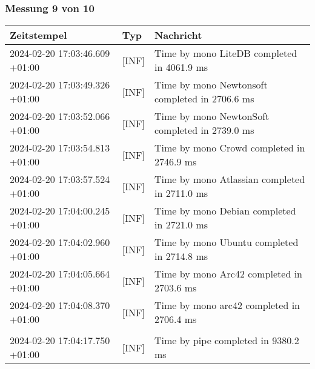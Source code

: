    \subsubsection*{Messung 9 von 10} \label{subsubsec:LiteDbWenigerPaketeAlsDb9von10}
        {
            {\small
                \begin{tabularx}{\textwidth}{|l|l|X|}
                    \hline
                    \textbf{Zeitstempel} & \textbf{Typ} & \textbf{Nachricht} \\
                    \hline
                    \endhead
                    2024-02-20 17:03:46.609 +01:00 & [INF] & Time by mono LiteDB completed in 4061.9 ms \\
                    2024-02-20 17:03:49.326 +01:00 & [INF] & Time by mono Newtonsoft completed in 2706.6 ms \\
                    2024-02-20 17:03:52.066 +01:00 & [INF] & Time by mono NewtonSoft completed in 2739.0 ms \\
                    2024-02-20 17:03:54.813 +01:00 & [INF] & Time by mono Crowd completed in 2746.9 ms \\
                    2024-02-20 17:03:57.524 +01:00 & [INF] & Time by mono Atlassian completed in 2711.0 ms \\
                    2024-02-20 17:04:00.245 +01:00 & [INF] & Time by mono Debian completed in 2721.0 ms \\
                    2024-02-20 17:04:02.960 +01:00 & [INF] & Time by mono Ubuntu completed in 2714.8 ms \\
                    2024-02-20 17:04:05.664 +01:00 & [INF] & Time by mono Arc42 completed in 2703.6 ms \\
                    2024-02-20 17:04:08.370 +01:00 & [INF] & Time by mono arc42 completed in 2706.4 ms \\
                    & & \\
                    2024-02-20 17:04:17.750 +01:00 & [INF] & Time by pipe completed in 9380.2 ms \\
                    \hline
                \end{tabularx}
            }
        }

